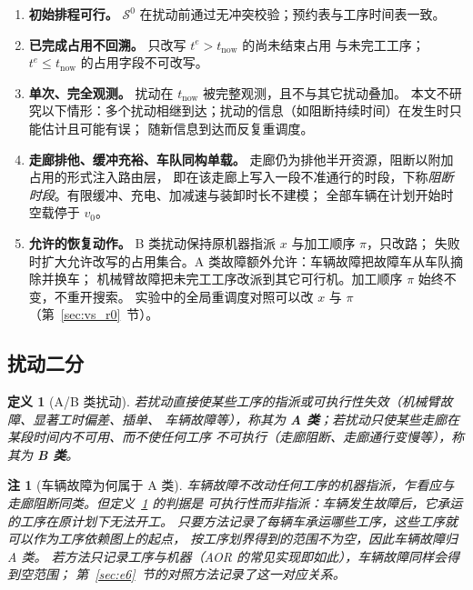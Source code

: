 \documentclass[manuscript,screen,review]{acmart}
\newtheorem{definition}{定义}
\newtheorem{remark}{注}
\begin{document}
\begin{enumerate}[label=\textbf{A\arabic*.},leftmargin=*,topsep=2pt,itemsep=2pt]
\item \textbf{初始排程可行。} \(\mathcal{S}^0\) 在扰动前通过无冲突校验；预约表与工序时间表一致。
\item \textbf{已完成占用不回溯。} 只改写 \(t^e>t_{\mathrm{now}}\) 的尚未结束占用
与未完工工序；\(t^e\le t_{\mathrm{now}}\) 的占用字段不可改写。
\item \textbf{单次、完全观测。} 扰动在 \(t_{\mathrm{now}}\) 被完整观测，且不与其它扰动叠加。
本文不研究以下情形：多个扰动相继到达；扰动的信息（如阻断持续时间）在发生时只能估计且可能有误；
随新信息到达而反复重调度。
\item \textbf{走廊排他、缓冲充裕、车队同构单载。} 走廊仍为排他半开资源，阻断以附加占用的形式注入路由层，
即在该走廊上写入一段不准通行的时段，下称\emph{阻断时段}。有限缓冲、充电、加减速与装卸时长不建模；
全部车辆在计划开始时空载停于 \(v_0\)。
\item \textbf{允许的恢复动作。} B 类扰动保持原机器指派 \(x\) 与加工顺序 \(\pi\)，只改路；
失败时扩大允许改写的占用集合。A 类故障额外允许：车辆故障把故障车从车队摘除并换车；
机械臂故障把未完工工序改派到其它可行机。加工顺序 \(\pi\) 始终不变，不重开搜索。
实验中的全局重调度对照可以改 \(x\) 与 \(\pi\)（第~\ref{sec:vs_r0}~节）。
\end{enumerate}

\subsection{扰动二分}
\label{sec:disturbance_classes}

\begin{definition}[A/B 类扰动]
\label{def:ab}
若扰动直接使某些工序的指派或\emph{可执行性}失效（机械臂故障、显著工时偏差、插单、
车辆故障等），称其为 \textbf{A 类}；若扰动只使某些走廊在某段时间内不可用、而不使任何工序
不可执行（走廊阻断、走廊通行变慢等），称其为 \textbf{B 类}。
\end{definition}

\begin{remark}[车辆故障为何属于 A 类]
\label{rem:agv_class}
车辆故障不改动任何工序的机器指派，乍看应与走廊阻断同类。但定义~\ref{def:ab} 的判据是
\emph{可执行性}而非指派：车辆发生故障后，它承运的工序在原计划下无法开工。
只要方法记录了每辆车承运哪些工序，这些工序就可以作为工序依赖图上的起点，
按工序划界得到的范围不为空，因此车辆故障归 A 类。
若方法只记录工序与机器（AOR 的常见实现即如此），车辆故障同样会得到空范围；
第~\ref{sec:e6}~节的对照方法记录了这一对应关系。
\end{remark}
\end{document}
